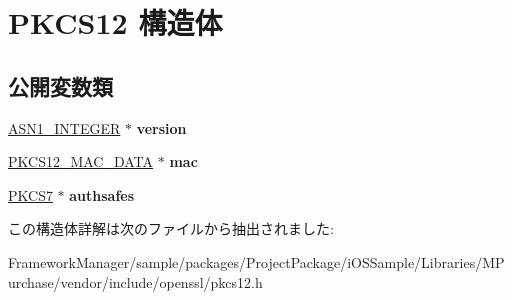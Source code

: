 \hypertarget{struct_p_k_c_s12}{}\section{P\+K\+C\+S12 構造体}
\label{struct_p_k_c_s12}
\subsection*{公開変数類}
\begin{DoxyCompactItemize}
\item 
\hypertarget{struct_p_k_c_s12_a36ed18715f06725345e12b6f9904e908}{}\hyperlink{structasn1__string__st}{A\+S\+N1\+\_\+\+I\+N\+T\+E\+G\+E\+R} $\ast$ {\bfseries version}\label{struct_p_k_c_s12_a36ed18715f06725345e12b6f9904e908}

\item 
\hypertarget{struct_p_k_c_s12_a5184aa35cbf7f56ab133402077c9ea8e}{}\hyperlink{struct_p_k_c_s12___m_a_c___d_a_t_a}{P\+K\+C\+S12\+\_\+\+M\+A\+C\+\_\+\+D\+A\+T\+A} $\ast$ {\bfseries mac}\label{struct_p_k_c_s12_a5184aa35cbf7f56ab133402077c9ea8e}

\item 
\hypertarget{struct_p_k_c_s12_ab861e41463d92627b4ff4a42ca1d2cee}{}\hyperlink{structpkcs7__st}{P\+K\+C\+S7} $\ast$ {\bfseries authsafes}\label{struct_p_k_c_s12_ab861e41463d92627b4ff4a42ca1d2cee}

\end{DoxyCompactItemize}


この構造体詳解は次のファイルから抽出されました\+:\begin{DoxyCompactItemize}
\item 
Framework\+Manager/sample/packages/\+Project\+Package/i\+O\+S\+Sample/\+Libraries/\+M\+Purchase/vendor/include/openssl/pkcs12.\+h\end{DoxyCompactItemize}
